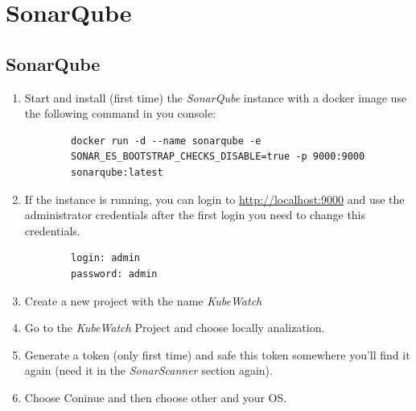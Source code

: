 \chapter{SonarQube}

\section{SonarQube}
\begin{enumerate}
    \item Start and install (first time) the \textit{SonarQube} instance with a docker image use the following command in you console: \begin{lstlisting}
        docker run -d --name sonarqube -e
        SONAR_ES_BOOTSTRAP_CHECKS_DISABLE=true -p 9000:9000
        sonarqube:latest
    \end{lstlisting}
    \item If the instance is running, you can login to \href{http://localhost:9000}{http://localhost:9000} and use the administrator credentials after the first login you need to change this credentials.
    \begin{lstlisting}
        login: admin
        password: admin
    \end{lstlisting}
    \item Create a new project with the name \textit{KubeWatch}
    \item Go to the \textit{KubeWatch} Project and choose locally analization.
    \item Generate a token (only first time) and safe this token somewhere you'll find it again (need it in the \textit{SonarScanner} section again).
    \item Choose Coninue and then choose other and your OS.
\end{enumerate}

